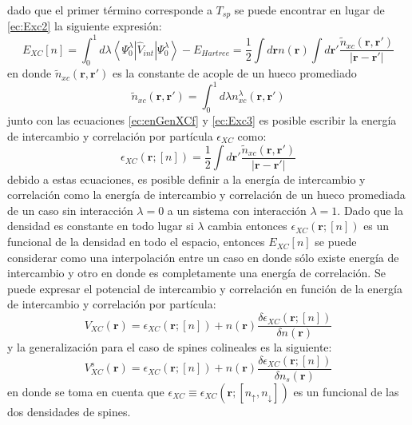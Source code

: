 \documentclass[12pt,a4paper, oneside]{book}
\begin{document}
   dado que el primer t\'ermino corresponde a $T_{sp}$ se puede encontrar en lugar de \ref{ec:Exc2} la siguiente expresi\'on:
   \begin{equation}
   E_{XC} [n] = \int_{0}^{1} d \lambda  \left \langle \Psi_0^{\lambda} \left | \hat{V}_{int} \right |  \Psi_0^{\lambda} \right \rangle-E_{Hartree} = \frac{1}{2} \int d \pmb{r} n(\pmb{r})\int d \pmb{r'}  \frac{\widetilde{n }_{xc}(\pmb{r},\pmb{r'})}{|\pmb{r}-\pmb{r'}|} \label{ec:Exc3}
   \end{equation}
   en donde $\widetilde{n }_{xc} (\pmb{r},\pmb{r'})$ es la constante de acople de un hueco promediado
   \begin{equation}
   \widetilde{n }_{xc} (\pmb{r},\pmb{r'}) = \int_{0}^{1} d \lambda n_{xc}^{\lambda} (\pmb{r},\pmb{r'}) \label{ec:avHole}
   \end{equation}
   junto con las ecuaciones \ref{ec:enGenXCf} y \ref{ec:Exc3} es posible escribir la energ\'ia de intercambio y correlaci\'on por part\'icula $\epsilon_{XC} $ como:
   \begin{equation}
   \epsilon_{XC} (\pmb{r}; [n])= \frac{1}{2} \int d \pmb{r'}  \frac{\widetilde{n }_{xc}(\pmb{r},\pmb{r'})}{|\pmb{r}-\pmb{r'}|} \label{ec:densEXC}
   \end{equation}
   debido a estas ecuaciones, es posible definir a la energ\'ia de intercambio y correlaci\'on como la energ\'ia  de intercambio y correlaci\'on de un hueco promediada de un caso sin interacci\'on $\lambda=0$ a un sistema con interacci\'on $\lambda=1$. Dado que la densidad es constante en todo lugar si $\lambda$ cambia entonces $\epsilon_{XC} (\pmb{r}; [n]) $ es un funcional de la densidad en todo el espacio, entonces $E_{XC} [n]$ se puede considerar como una interpolaci\'on entre un caso en donde s\'olo existe energ\'ia de intercambio y otro en donde es completamente una energ\'ia de correlaci\'on.  Se puede expresar el potencial de intercambio y correlaci\'on en funci\'on de la energ\'ia de intercambio y correlaci\'on por part\'icula:
   \begin{equation}
   V_{XC} (\pmb{r}) = \epsilon_{XC} (\pmb{r}; [n]) + n(\pmb{r}) \frac{\delta \epsilon_{XC} (\pmb{r}; [n])}{\delta n(\pmb{r}) } \label{ec:potXC}
   \end{equation}  
   y la generalizaci\'on para el caso de spines colineales es la siguiente:
   \begin{equation}
   V_{XC}^s (\pmb{r}) = \epsilon_{XC} (\pmb{r}; [n]) + n(\pmb{r}) \frac{\delta \epsilon_{XC} (\pmb{r}; [n])}{\delta n_s(\pmb{r}) } \label{ec:potXCspin}
   \end{equation}
   en donde se toma en cuenta que $\epsilon_{XC} \equiv \epsilon_{XC} \left(\pmb{r}; \left[ n_{\uparrow}, n_{\downarrow} \right]\right) $ es un funcional de las dos densidades de spines.
\end{document}
